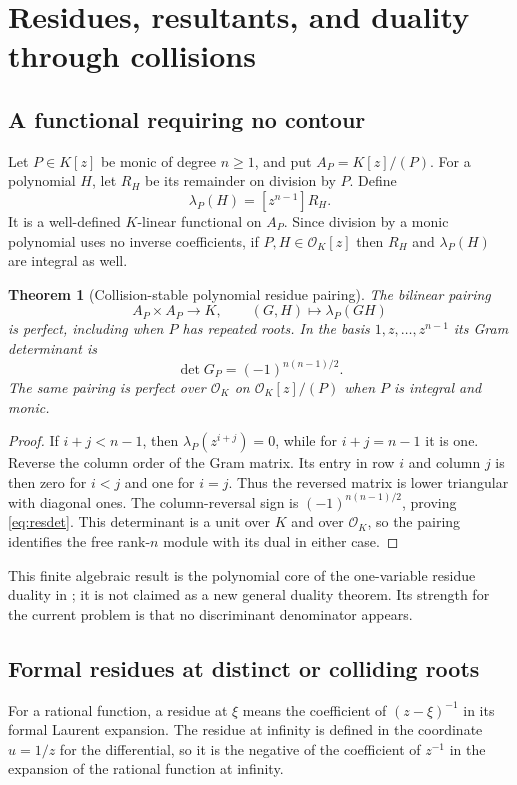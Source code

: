 \documentclass[11pt,letterpaper]{article}
\numberwithin{equation}{section}
\newtheorem{theorem}{Theorem}[section]
\theoremstyle{definition}
\theoremstyle{remark}\newtheorem{remark}[theorem]{Remark}
\newcommand{\OO}{\mathcal O}
\begin{document}
\section{Residues, resultants, and duality through collisions}\label{sec:residue}

\subsection{A functional requiring no contour}
Let $P\in K[z]$ be monic of degree $n\ge1$, and put $A_P=K[z]/(P)$.
For a polynomial $H$, let $R_H$ be its remainder on division by $P$.
Define
\begin{equation}\label{eq:lambda}
 \lambda_P(H)=[z^{n-1}]R_H.
\end{equation}
It is a well-defined $K$-linear functional on $A_P$. Since division by
a monic polynomial uses no inverse coefficients, if $P,H\in\OO_K[z]$
then $R_H$ and $\lambda_P(H)$ are integral as well.

\begin{theorem}[Collision-stable polynomial residue pairing]
\label{thm:residuepairing}
The bilinear pairing
\[
 A_P\times A_P\longrightarrow K,\qquad (G,H)\longmapsto\lambda_P(GH)
\]
is perfect, including when $P$ has repeated roots. In the basis
$1,z,\ldots,z^{n-1}$ its Gram determinant is
\begin{equation}\label{eq:resdet}
 \det G_P=(-1)^{n(n-1)/2}.
\end{equation}
The same pairing is perfect over $\OO_K$ on $\OO_K[z]/(P)$ when
$P$ is integral and monic.
\end{theorem}
\begin{proof}
If $i+j<n-1$, then $\lambda_P(z^{i+j})=0$, while for $i+j=n-1$ it
is one. Reverse the column order of the Gram matrix. Its entry in
row $i$ and column $j$ is then zero for $i<j$ and one for $i=j$.
Thus the reversed matrix is lower triangular with diagonal ones.
The column-reversal sign is $(-1)^{n(n-1)/2}$, proving
\eqref{eq:resdet}. This determinant is a unit over $K$ and over
$\OO_K$, so the pairing identifies the free rank-$n$ module with its
dual in either case.
\end{proof}
This finite algebraic result is the polynomial core of the
one-variable residue duality in \cite{SourceResearch}; it is not
claimed as a new general duality theorem. Its strength for the current
problem is that no discriminant denominator appears.

\subsection{Formal residues at distinct or colliding roots}
For a rational function, a residue at $\xi$ means the coefficient of
$(z-\xi)^{-1}$ in its formal Laurent expansion. The residue at infinity
is defined in the coordinate $u=1/z$ for the differential, so it is
the negative of the coefficient of $z^{-1}$ in the expansion of the
rational function at infinity.
\end{document}
